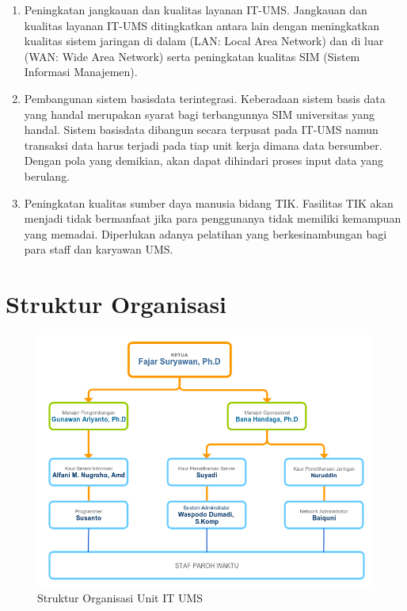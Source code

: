 \begin{enumerate}[itemsep=-1ex]
\item Peningkatan jangkauan dan kualitas layanan IT-UMS. Jangkauan dan kualitas layanan IT-UMS  ditingkatkan antara lain dengan meningkatkan kualitas sistem jaringan di dalam (LAN: Local Area  Network) dan di luar (WAN: Wide Area Network)  serta peningkatan kualitas SIM (Sistem    Informasi Manajemen).

\item Pembangunan sistem basisdata terintegrasi. Keberadaan sistem basis data yang handal merupakan syarat bagi terbangunnya SIM universitas yang handal. Sistem basisdata dibangun secara terpusat pada IT-UMS namun transaksi data harus terjadi pada tiap unit kerja dimana data bersumber. Dengan pola yang demikian, akan dapat dihindari proses input data yang berulang.

\item Peningkatan kualitas sumber daya manusia bidang TIK. Fasilitas TIK akan menjadi tidak bermanfaat jika para penggunanya tidak memiliki kemampuan yang memadai. Diperlukan adanya  pelatihan yang berkesinambungan bagi para staff dan karyawan UMS.
\end{enumerate}

\section{Struktur Organisasi}

\begin{figure}
\begin{center}
\includegraphics[width=1.0\textwidth]{pics/struktur.png}
\end{center}
\caption{Struktur Organisasi Unit IT UMS}
\end{figure}    

